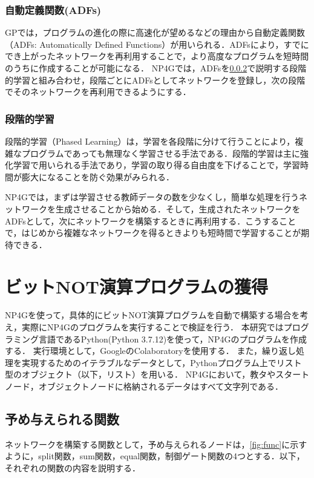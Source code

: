 \documentclass[exploratorypaper]{jsaiart} %
\begin{document}
\subsubsection{自動定義関数(ADFs)}
GPでは，プログラムの進化の際に高速化が望めるなどの理由から自動定義関数（ADFs: Automatically Defined Functions）が用いられる\cite{adfs}．ADFsにより，すでにでき上がったネットワークを再利用することで，より高度なプログラムを短時間のうちに作成することが可能になる．
NP4Gでは，ADFsを\ref{sec:PL}で説明する段階的学習と組み合わせ，段階ごとにADFsとしてネットワークを登録し，次の段階でそのネットワークを再利用できるようにする．

\subsubsection{段階的学習}
\label{sec:PL}
段階的学習（Phased Learning）は，学習を各段階に分けて行うことにより，複雑なプログラムであっても無理なく学習させる手法である．段階的学習は主に強化学習で用いられる手法であり，学習の取り得る自由度を下げることで，学習時間が膨大になることを防ぐ効果がみられる\cite{hodohara2012reinforcement}．

NP4Gでは，まずは学習させる教師データの数を少なくし，簡単な処理を行うネットワークを生成させることから始める．そして，生成されたネットワークをADFsとして，次にネットワークを構築するときに再利用する．こうすることで，はじめから複雑なネットワークを得るときよりも短時間で学習することが期待できる．

\section{ビットNOT演算プログラムの獲得}
NP4Gを使って，具体的にビットNOT演算プログラムを自動で構築する場合を考え，実際にNP4Gのプログラムを実行することで検証を行う．
本研究ではプログラミング言語であるPython(Python 3.7.12)を使って，NP4Gのプログラムを作成する．
実行環境として，GoogleのColaboratoryを使用する．
また，繰り返し処理を実現するためのイテラブルなデータとして，Pythonプログラム上でリスト型のオブジェクト（以下，リスト）を用いる．
NP4Gにおいて，教タやスタートノード，オブジェクトノードに格納されるデータはすべて文字列である．

\subsection{予め与えられる関数}
ネットワークを構築する関数として，予め与えられるノードは，\ref{fig:func}に示すように，split関数，sum関数，equal関数，制御ゲート関数の4つとする．以下，それぞれの関数の内容を説明する．
\end{document}
